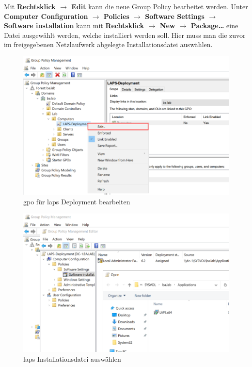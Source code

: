 Mit \textbf{Rechtsklick $\rightarrow$ Edit} kann die neue Group Policy bearbeitet werden.
Unter \textbf{Computer Configuration $\rightarrow$ Policies $\rightarrow$ Software Settings $\rightarrow$ Software installation} kann mit \textbf{Rechtsklick $\rightarrow$ New $\rightarrow$ Package\dots} eine Datei ausgewählt werden, welche installiert werden soll.
Hier muss man die zuvor im freigegebenen Netzlaufwerk abgelegte Installationsdatei auswählen.\\
\begin{minipage}{0.5\linewidth}
    \begin{figure}[H]
        \centering
        \includegraphics[width=\linewidth]{../img/LAPS/GPO-Edit-Deployment.png}
        \caption{\acrshort{gpo} für \acrshort{laps} Deployment bearbeiten}
    \end{figure}
\end{minipage}
\begin{minipage}{0.5\linewidth}
    \begin{figure}[H]
        \centering
        \includegraphics[width=\linewidth]{../img/LAPS/GPO-Edit-Deployment-2.png}
        \caption{\acrshort{laps} Installationsdatei auswählen}
    \end{figure}
\end{minipage}\\

